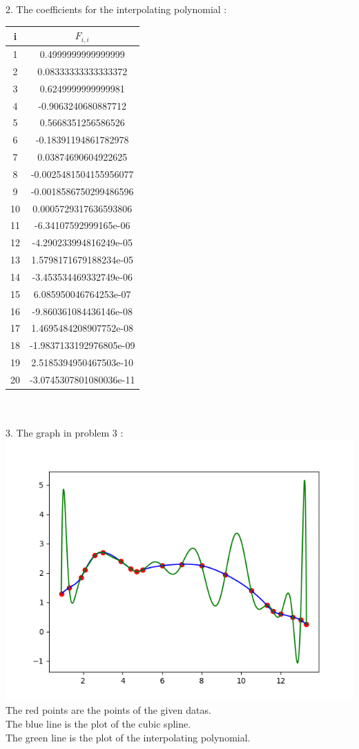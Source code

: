 \documentclass{article}
\begin{document}
\\
\\
2. The coefficients for the interpolating polynomial :\\
\begin{tabular}{c|c}
i&$F_{i,i}$\\
\hline
1&0.4999999999999999\\
2&0.08333333333333372\\
3&0.6249999999999981\\
4&-0.9063240680887712\\
5&0.5668351256586526\\
6&-0.18391194861782978\\
7&0.03874690604922625\\
8&-0.0025481504155956077\\
9&-0.0018586750299486596\\
10&0.0005729317636593806\\
11&-6.34107592999165e-06\\
12&-4.290233994816249e-05\\
13&1.5798171679188234e-05\\
14&-3.453534469332749e-06\\
15&6.085950046764253e-07\\
16&-9.860361084436146e-08\\
17&1.4695484208907752e-08\\
18&-1.9837133192976805e-09\\
19&2.5185394950467503e-10\\
20&-3.0745307801080036e-11\\
\end{tabular}\\
\\
3. The graph in problem 3 :\\
\includegraphics[scale=0.6]{1.png}\\
The red points are the points of the given datas.\\
The blue line is the plot of the cubic spline.\\
The green line is the plot of the interpolating polynomial.\\
\end{document}

